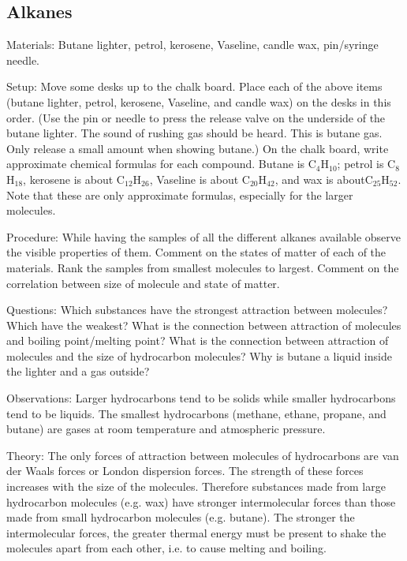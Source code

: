\begin{multicols}{2}
\subsection{Alkanes}


\begin{description*}
\item[Materials:]{Butane lighter, petrol, kerosene, Vaseline, candle wax, pin/syringe needle.}
\item[Setup:]{Move some desks up to the chalk board. Place each of the above items (butane lighter, petrol, kerosene, Vaseline, and candle wax) on the desks in this order. (Use the pin or needle to press the release valve on the underside of the butane lighter. The sound of rushing gas should be heard. This is butane gas. Only release a small amount when showing butane.) On the chalk board, write approximate chemical formulas for each compound. Butane is \ce C$_4$H$_{10}$; petrol is \ce C$_8$H$_{18}$, kerosene is about \ce C$_{12}$H$_{26}$, Vaseline is about \ce C$_{20}$H$_{42}$, and wax is about\ce C$_{25}$H$_{52}$. Note that these are only approximate formulas, especially for the larger molecules.}
\item[Procedure:]{While having the samples of all the different alkanes available observe the visible properties of them. Comment on the states of matter of each of the materials. Rank the samples from smallest molecules to largest. Comment on the correlation between size of molecule and state of matter.}
\item[Questions:]{Which substances have the strongest attraction between molecules? Which have the weakest? What is the connection between attraction of molecules and boiling point/melting point? What is the connection between attraction of molecules and the size of hydrocarbon molecules? Why is butane a liquid inside the lighter and a gas outside?}
\item[Observations:]{Larger hydrocarbons tend to be solids while smaller hydrocarbons tend to be liquids. The smallest hydrocarbons (methane, ethane, propane, and butane) are gases at room temperature and atmospheric pressure.}
\item[Theory:]{The only forces of attraction between molecules of hydrocarbons are van der Waals forces or London dispersion forces. The strength of these forces increases with the size of the molecules. Therefore substances made from large hydrocarbon molecules (e.g. wax) have stronger intermolecular forces than those made from small hydrocarbon molecules (e.g. butane). The stronger the intermolecular forces, the greater thermal energy must be present to shake the molecules apart from each other, i.e. to cause melting and boiling.}

\end{description*}
\end{multicols}
